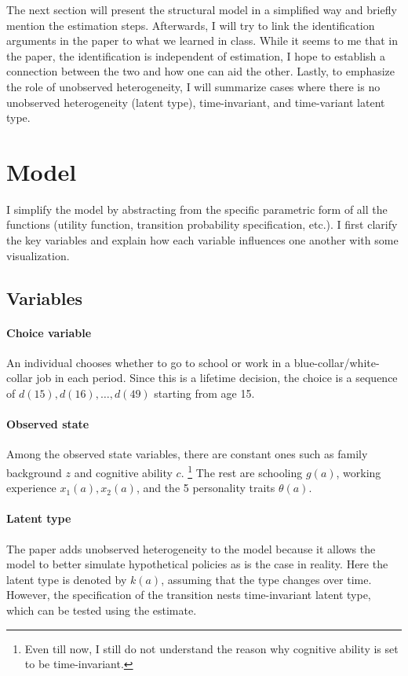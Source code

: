 \documentclass[12pt]{article}
\begin{document}
The next section will present the structural model in a simplified way and
briefly mention the estimation steps. Afterwards, I will try to link
the identification arguments in the paper to what we learned in class. While it
seems to me that in the paper, the identification is independent of estimation,
I hope to establish a connection between the two and how one can aid the other.
Lastly, to emphasize the role of unobserved heterogeneity, I will summarize
cases where there is no unobserved heterogeneity (latent type), time-invariant,
and time-variant latent type.

\section{Model}
I simplify the model by abstracting from the specific parametric form of all the functions (utility function, transition probability specification, etc.). I first clarify the key variables and explain how each variable influences one another with some visualization.

\subsection{Variables}
\paragraph{Choice variable} An individual chooses whether to go to school or work in a blue-collar/white-collar job in each period. Since this is a lifetime decision, the choice is a sequence of $d(15), d(16), \ldots, d(49)$ starting from age 15.

\paragraph{Observed state} Among the observed state variables, there are constant ones such as family background $z$ and cognitive ability $c$. \footnote{Even till now, I still do not understand the reason why cognitive ability is set to be time-invariant.} The rest are schooling $g(a)$, working experience $x_1(a), x_2(a)$, and the 5 personality traits $\theta(a)$.

\paragraph{Latent type} The paper adds unobserved heterogeneity to the model because it allows the model to better simulate hypothetical policies as is the case in reality. Here the latent type is denoted by $k(a)$, assuming that the type changes over time. However, the specification of the transition nests time-invariant latent type, which can be tested using the estimate.
\end{document}
